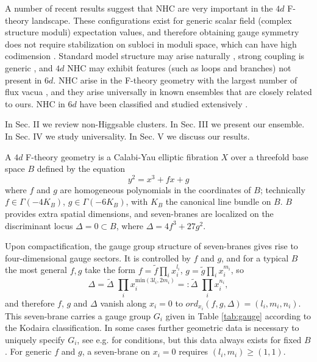 \documentclass[aps,prl,twocolumn, superscriptaddress,groupedaddress,nofootinbib]{revtex4-1}
\begin{document}
A number of recent results suggest that NHC are very
important in the $4d$ F-theory landscape. These configurations exist for generic
 scalar field (complex structure moduli) expectation values, and therefore obtaining
gauge symmetry does not require \cite{Grassi:2014zxa} stabilization on subloci in 
moduli space, which can have high codimension \cite{Braun:2014xka,*Watari:2015ysa,*Halverson:2016tve}. Standard model structure may arise naturally \cite{Grassi:2014zxa}, strong coupling is generic \cite{Halverson:2016vwx}, and $4d$ NHC may exhibit features \cite{Morrison:2014lca} (such as loops and branches) not present
in $6d$. NHC arise in the F-theory geometry with the largest number of flux
vacua \cite{Taylor:2015xtz}, and they arise universally in known ensembles 
\cite{Halverson:2015jua,*Taylor:2015ppa} that are closely related to ours.
NHC in $6d$ have been classified 
\cite{Morrison:2012np} and studied extensively \cite{Morrison:2012js,*Taylor:2012dr,*Morrison:2014era,*Martini:2014iza,*Johnson:2014xpa,*Taylor:2015isa}.

In Sec. II we review non-Higgsable clusters. In Sec. III we present our ensemble.
In Sec. IV we study universality. In Sec. V we discuss our results.


\vspace{.2cm}
A $4d$ F-theory geometry is a Calabi-Yau elliptic fibration
$X$ over a threefold base space $B$ defined by the equation
\begin{equation}
y^2=x^3+f x + g
\end{equation}
where $f$ and $g$ are homogeneous polynomials in the coordinates
of $B$; technically $f\in \Gamma(-4K_B)$, $g\in \Gamma(-6K_B)$,
with $K_B$ the canonical line bundle on $B$. $B$ provides extra spatial dimensions, and seven-branes are localized on the discriminant locus
$\Delta=0\subset B$, where $\Delta = 4f^3+27g^2$.

Upon compactification, the gauge group structure of seven-branes gives rise
to four-dimensional gauge sectors. It is controlled by $f$ and
$g$, and for a typical $B$ the most general $f, g$ take the
form $f=\tilde f \prod_i x_i^{l_i}$, $g=\tilde g \prod_i x_i^{m_i}$,
so
\begin{equation}
\Delta = \tilde \Delta\,\,  \prod_i x_i^{\text{min}(3l_i,2m_i)}=: \tilde \Delta\,\,  \prod_i x_i^{n_i},
\end{equation}
and therefore $f$, $g$ and $\Delta$ vanish along $x_i=0$ to 
$ord_{x_i}(f,g,\Delta)=(l_i,m_i,n_i).$ This seven-brane carries
a gauge group $G_i$ given in Table \ref{tab:gauge}
according to the Kodaira classification. In some cases
further geometric data is necessary to uniquely 
specify $G_i$, see e.g. 
\cite{Halverson:2015jua} for conditions, but this data
always exists for fixed $B$. 
For generic $f$ and $g$, a seven-brane on $x_i=0$
requires $(l_i,m_i)\geq(1,1)$.
\end{document}
